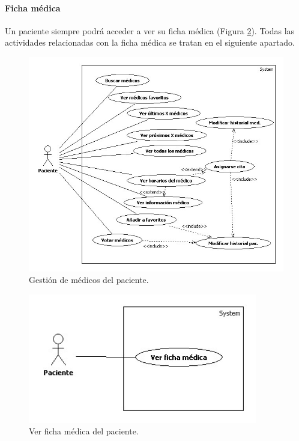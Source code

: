 
				\paragraph{Ficha médica} %
				\label{par:ficha_medica}

					Un paciente siempre podrá acceder a ver su ficha médica (Figura \ref{fig:ficha_pac}). Todas las actividades relacionadas con la ficha médica se tratan en el siguiente apartado.
					\begin{figure}[H]
					  \centering
					    \includegraphics[width=14cm]{img/jpg/casos_uso/Gestion_medicos.jpg}
					  \caption{Gestión de médicos del paciente.}
					  \label{fig:med_pac}
					\end{figure}

					\begin{figure}[H]
					  \centering
					    \includegraphics[width=10cm]{img/jpg/casos_uso/Ver_ficha_medica.jpg}
					  \caption{Ver ficha médica del paciente.}
					  \label{fig:ficha_pac}
					\end{figure}

